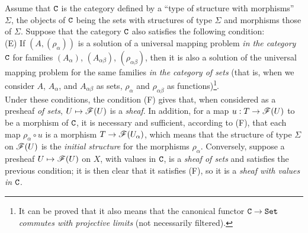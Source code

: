 \begin{env}[3.1.3]
\label{0.3.1.3}
Assume that $\mathtt{C}$ is the category defined by a
``type of structure with morphisms'' $\Sigma$, the objects of $\mathtt{C}$ being the
sets with structures of type $\Sigma$ and morphisms those of $\Sigma$. Suppose
that the category $\mathtt{C}$ also satisfies the following condition:\\

(E) If $(A,(\rho_\alpha))$ is a solution of a universal mapping problem {\em in
    the category $\mathtt{C}$} for families $(A_\alpha)$, $(A_{\alpha\beta})$,
    $(\rho_{\alpha\beta})$, then it is also a solution of the universal mapping
    problem for the same families {\em in the category of sets} (that is, when
    we consider $A$, $A_\alpha$, and $A_{\alpha\beta}$ as sets, $\rho_\alpha$
    and $\rho_{\alpha\beta}$ as functions)\footnote{It can be proved that it
    also means that the canonical functor $\mathtt{C}\to\mathtt{Set}$ {\em commutes with
    projective limits} (not necessarily filtered).}.\\

Under these conditions, the condition (F) gives that, when considered as a
presheaf {\em of sets}, $U\mapsto\mathscr{F}(U)$ is a {\em sheaf}. In addition, for
a map $u:T\to\mathscr{F}(U)$ to be a morphism of $\mathtt{C}$, it is necessary and
sufficient, according to (F), that each map $\rho_\alpha\circ u$ is a morphism
$T\to\mathscr{F}(U_\alpha)$, which means that the structure of type $\Sigma$ on
$\mathscr{F}(U)$ is the {\em initial structure} for the morphisms $\rho_\alpha$.
Conversely, suppose a presheaf $U\mapsto\mathscr{F}(U)$ on $X$, with values in $\mathtt{C}$,
is a {\em sheaf of sets} and satisfies the previous condition; it is then clear
that it satisfies (F), so it is a {\em sheaf with values in $\mathtt{C}$}.
\end{env}

